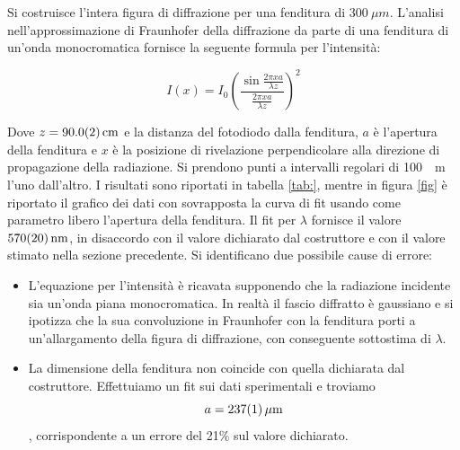 \documentclass[10pt,oneside,a4paper]{article}
\begin{document}
\begin{multicols}{2}
Si costruisce l'intera figura di diffrazione per una fenditura di $\SI{300}{\mu m}$. L'analisi nell'approssimazione di Fraunhofer della diffrazione da parte di una fenditura di un'onda monocromatica fornisce la seguente formula per l'intensità:

$$I(x) = I_0 (\frac{\sin\frac{2\pi xa}{\lambda z}}{\frac{2\pi xa}{\lambda z}})^2 $$


Dove $z = \SI{90.0 \pm 0.2}{cm}$ e la distanza del fotodiodo dalla fenditura, $a$ è l'apertura della fenditura e $x$ è la posizione di rivelazione perpendicolare alla direzione di propagazione della radiazione.
Si prendono punti a intervalli regolari di \SI{100}{\mu m} l'uno dall'altro. I risultati sono riportati in tabella \ref{tab:}, mentre in figura \ref{fig} è riportato il grafico dei dati con sovrapposta la curva di fit usando come parametro libero l'apertura della fenditura. Il fit per $\lambda$ fornisce il valore $\SI{570 \pm 20}{nm}$, in disaccordo con il valore dichiarato dal costruttore e con il valore stimato nella sezione precedente. Si identificano due possibile cause di errore:
\begin{itemize}
\item L'equazione per l'intensità è ricavata supponendo che la radiazione incidente sia un'onda piana monocromatica. In realtà il fascio diffratto è gaussiano e si ipotizza che la sua convoluzione in Fraunhofer con la fenditura porti a un'allargamento della figura di diffrazione, con conseguente sottostima di $\lambda$.
\item La dimensione della fenditura non coincide con quella dichiarata dal costruttore. Effettuiamo un fit sui dati sperimentali e troviamo $$a = \SI{237 \pm 1}{\mu m}$$, corrispondente a un errore del 21\% sul valore dichiarato.
\end{itemize}


\end{multicols}
\end{document}
